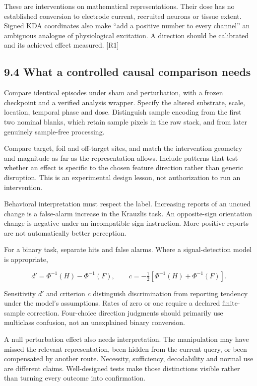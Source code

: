 \documentclass[
  11pt,
]{article}
\let\oldsubsection\subsection
\renewcommand{\subsection}{\Needspace{6\baselineskip}\oldsubsection}
\begin{document}
These are interventions on mathematical representations. Their dose has
no established conversion to electrode current, recruited neurons or
tissue extent. Signed KDA coordinates also make ``add a positive number
to every channel'' an ambiguous analogue of physiological excitation. A
direction should be calibrated and its achieved effect measured.
{[}R1{]}

\subsection{9.4 What a controlled causal comparison
needs}\label{what-a-controlled-causal-comparison-needs}

Compare identical episodes under sham and perturbation, with a frozen
checkpoint and a verified analysis wrapper. Specify the altered
substrate, scale, location, temporal phase and dose. Distinguish sample
encoding from the first two nominal blanks, which retain sample pixels
in the raw stack, and from later genuinely sample-free processing.

Compare target, foil and off-target sites, and match the intervention
geometry and magnitude as far as the representation allows. Include
patterns that test whether an effect is specific to the chosen feature
direction rather than generic disruption. This is an experimental design
lesson, not authorization to run an intervention.

Behavioral interpretation must respect the label. Increasing reports of
an uncued change is a false-alarm increase in the Krauzlis task. An
opposite-sign orientation change is negative under an incompatible sign
instruction. More positive reports are not automatically better
perception.

For a binary task, separate hits and false alarms. Where a
signal-detection model is appropriate,

\[d'=\Phi^{-1}(H)-\Phi^{-1}(F),\qquad
c=-\tfrac12[\Phi^{-1}(H)+\Phi^{-1}(F)].\]

Sensitivity \(d'\) and criterion \(c\) distinguish discrimination from
reporting tendency under the model's assumptions. Rates of zero or one
require a declared finite-sample correction. Four-choice direction
judgments should primarily use multiclass confusion, not an unexplained
binary conversion.

A null perturbation effect also needs interpretation. The manipulation
may have missed the relevant representation, been hidden from the
current query, or been compensated by another route. Necessity,
sufficiency, decodability and normal use are different claims.
Well-designed tests make those distinctions visible rather than turning
every outcome into confirmation.
\end{document}
